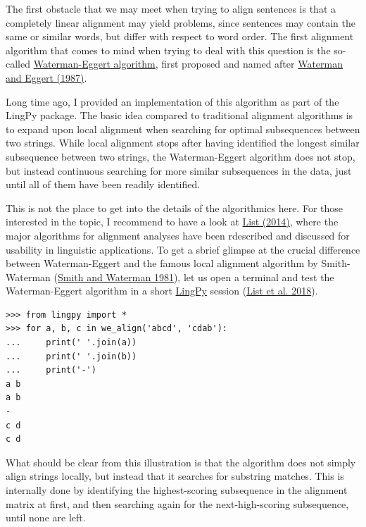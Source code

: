 \documentclass[
  a4paper,
  14pt,
  oneside,
  tablecaptionabove
]{scrbook}
\begin{document}
The first obstacle that we may meet when trying to align sentences is
that a completely linear alignment may yield problems, since sentences
may contain the same or similar words, but differ with respect to word
order. The first alignment algorithm that comes to mind when trying to
deal with this question is the so-called
\href{http://www.bioinformatics.nl/cgi-bin/emboss/help/matcher}{Waterman-Eggert
algorithm}, first proposed and named after
\href{http://bibliography.lingpy.org?key=Waterman1987}{Waterman and
Eggert (1987)}.

Long time ago, I provided an implementation of this algorithm as part of
the LingPy package. The basic idea compared to traditional alignment
algorithms is to expand upon local alignment when searching for optimal
subsequences between two strings. While local alignment stops after
having identified the longest similar subsequence between two strings,
the Waterman-Eggert algorithm does not stop, but instead continuous
searching for more similar subsequences in the data, just until all of
them have been readily identified.

This is not the place to get into the details of the algorithmics here.
For those interested in the topic, I recommend to have a look at
\href{http://bibliography.lingpy.org?key=List2014d}{List (2014)}, where
the major algorithms for alignment analyses have been rdescribed and
discussed for usability in linguistic applications. To get a sbrief
glimpse at the crucial difference between Waterman-Eggert and the famous
local alignment algorithm by Smith-Waterman (\href{http://bibliography.lingpy.org?key=Smith1981}{Smith and Waterman
1981}), let us open a terminal and test the Waterman-Eggert algorithm
in a short \href{http://lingpy.org}{LingPy} session (\href{http://bibliography.lingpy.org?key=List2018i}{List et al. 2018}).

\begin{lstlisting}
>>> from lingpy import *
>>> for a, b, c in we_align('abcd', 'cdab'):
...     print(' '.join(a))
...     print(' '.join(b))
...     print('-')
a b
a b
-
c d
c d
\end{lstlisting}

What should be clear from this illustration is that the algorithm does
not simply align strings locally, but instead that it searches for
substring matches. This is internally done by identifying the
highest-scoring subsequence in the alignment matrix at first, and then
searching again for the next-high-scoring subsequence, until none are
left.
\end{document}
